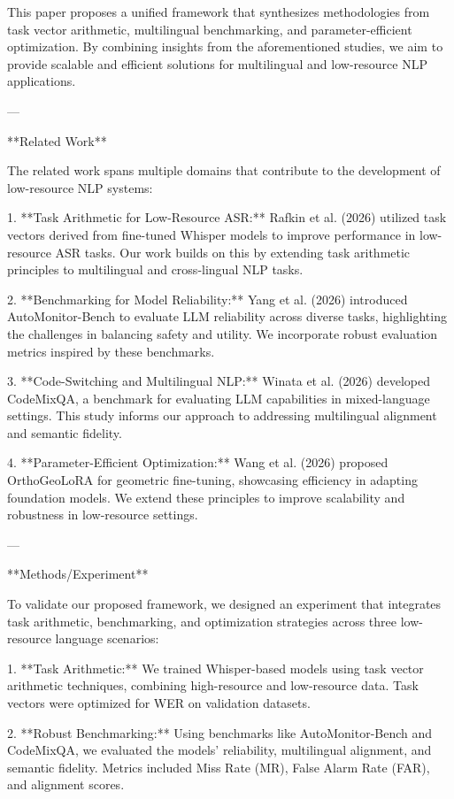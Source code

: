 This paper proposes a unified framework that synthesizes methodologies from task vector arithmetic, multilingual benchmarking, and parameter-efficient optimization. By combining insights from the aforementioned studies, we aim to provide scalable and efficient solutions for multilingual and low-resource NLP applications.

---

**Related Work**

The related work spans multiple domains that contribute to the development of low-resource NLP systems:

1. **Task Arithmetic for Low-Resource ASR:** Rafkin et al. (2026) utilized task vectors derived from fine-tuned Whisper models to improve performance in low-resource ASR tasks. Our work builds on this by extending task arithmetic principles to multilingual and cross-lingual NLP tasks.

2. **Benchmarking for Model Reliability:** Yang et al. (2026) introduced AutoMonitor-Bench to evaluate LLM reliability across diverse tasks, highlighting the challenges in balancing safety and utility. We incorporate robust evaluation metrics inspired by these benchmarks.

3. **Code-Switching and Multilingual NLP:** Winata et al. (2026) developed CodeMixQA, a benchmark for evaluating LLM capabilities in mixed-language settings. This study informs our approach to addressing multilingual alignment and semantic fidelity.

4. **Parameter-Efficient Optimization:** Wang et al. (2026) proposed OrthoGeoLoRA for geometric fine-tuning, showcasing efficiency in adapting foundation models. We extend these principles to improve scalability and robustness in low-resource settings.

---

**Methods/Experiment**

To validate our proposed framework, we designed an experiment that integrates task arithmetic, benchmarking, and optimization strategies across three low-resource language scenarios:

1. **Task Arithmetic:** We trained Whisper-based models using task vector arithmetic techniques, combining high-resource and low-resource data. Task vectors were optimized for WER on validation datasets.

2. **Robust Benchmarking:** Using benchmarks like AutoMonitor-Bench and CodeMixQA, we evaluated the models' reliability, multilingual alignment, and semantic fidelity. Metrics included Miss Rate (MR), False Alarm Rate (FAR), and alignment scores.

